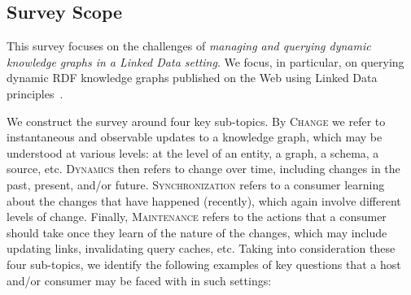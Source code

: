 \documentclass[sw]{iosart2x}
\newcommand{\ah}[1]{{\color{blue!70!black}\textsc{ah:} #1}}
\begin{document}

\subsection{Survey Scope}\label{Scopes}



This survey focuses on the challenges of \textit{managing and querying dynamic knowledge graphs in a Linked Data setting}. We focus, in particular, on querying dynamic RDF knowledge graphs published on the Web using Linked Data principles~\cite{ldprinciples,ldbook}.

We construct the survey around four key sub-topics. By \textsc{Change} we refer to instantaneous and observable updates to a knowledge graph, which may be understood at various levels: at the level of an entity, a graph, a schema, a source, etc. \textsc{Dynamics} then refers to change over time, including changes in the past, present, and/or future. \textsc{Synchronization} refers to a consumer learning about the changes that have happened (recently), which again involve different levels of change. Finally,  \textsc{Maintenance} refers to the actions that a consumer should take once they learn of the nature of the changes, which may include updating links, invalidating query caches, etc. Taking into consideration these four sub-topics, we identify the following examples of key questions that a host and/or consumer may be faced with in such settings:
\end{document}
